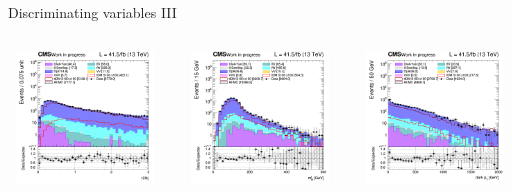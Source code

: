 \documentclass[8pt]{beamer}
\begin{document}
\begin{frame}{Discriminating variables III}
\begin{columns}
\begin{column}{0.33\textwidth}
\begin{center}
    		\end{center}		
		\end{column}
\end{columns}
\begin{columns}
		\begin{column}{0.33\textwidth}
			\begin{center}
     			\includegraphics[width=1.0\textwidth, height=100pt]{figs/2017/SmearSR-ttDM-scalar100/log_cratio_topCR_ll_r2l4j.png}
    		\end{center}		
		\end{column}
		\begin{column}{0.33\textwidth}
			\begin{center}
     			\includegraphics[width=1.0\textwidth, height=100pt]{figs/2017/SmearSR-ttDM-scalar100/log_cratio_topCR_ll_mblt.png}
    		\end{center}		
		\end{column}
		\begin{column}{0.33\textwidth}
			\begin{center}
     			\includegraphics[width=1.0\textwidth, height=100pt]{figs/2017/SmearSR-ttDM-scalar100/log_cratio_topCR_ll_dark_pt.png}
    		\end{center}		
		\end{column}
\end{columns} \vfill
\end{frame}
\end{document}
